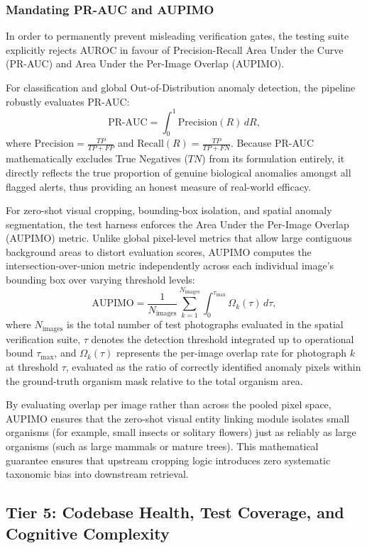 \subsubsection{Mandating PR-AUC and AUPIMO}
In order to permanently prevent misleading verification gates, the testing suite explicitly rejects AUROC in favour of Precision-Recall Area Under the Curve (PR-AUC) and Area Under the Per-Image Overlap (AUPIMO).

For classification and global Out-of-Distribution anomaly detection, the pipeline robustly evaluates PR-AUC:
\[
\text{PR-AUC} = \int_{0}^{1} \text{Precision}(R) \, dR,
\]
where $\text{Precision} = \frac{TP}{TP + FP}$ and $\text{Recall} (R) = \frac{TP}{TP + FN}$. Because PR-AUC mathematically excludes True Negatives ($TN$) from its formulation entirely, it directly reflects the true proportion of genuine biological anomalies amongst all flagged alerts, thus providing an honest measure of real-world efficacy.

For zero-shot visual cropping, bounding-box isolation, and spatial anomaly segmentation, the test harness enforces the Area Under the Per-Image Overlap (AUPIMO) metric. Unlike global pixel-level metrics that allow large contiguous background areas to distort evaluation scores, AUPIMO computes the intersection-over-union metric independently across each individual image's bounding box over varying threshold levels:
\[
\text{AUPIMO} = \frac{1}{N_{\text{images}}} \sum_{k=1}^{N_{\text{images}}} \int_{0}^{\tau_{\max}} \Omega_k(\tau) \, d\tau,
\]
where $N_{\text{images}}$ is the total number of test photographs evaluated in the spatial verification suite, $\tau$ denotes the detection threshold integrated up to operational bound $\tau_{\max}$, and $\Omega_k(\tau)$ represents the per-image overlap rate for photograph $k$ at threshold $\tau$, evaluated as the ratio of correctly identified anomaly pixels within the ground-truth organism mask relative to the total organism area.

By evaluating overlap per image rather than across the pooled pixel space, AUPIMO ensures that the zero-shot visual entity linking module isolates small organisms (for example, small insects or solitary flowers) just as reliably as large organisms (such as large mammals or mature trees). This mathematical guarantee ensures that upstream cropping logic introduces zero systematic taxonomic bias into downstream retrieval.

\subsection{Tier 5: Codebase Health, Test Coverage, and Cognitive Complexity}
\label{subsec:tier5_coverage_complexity}

